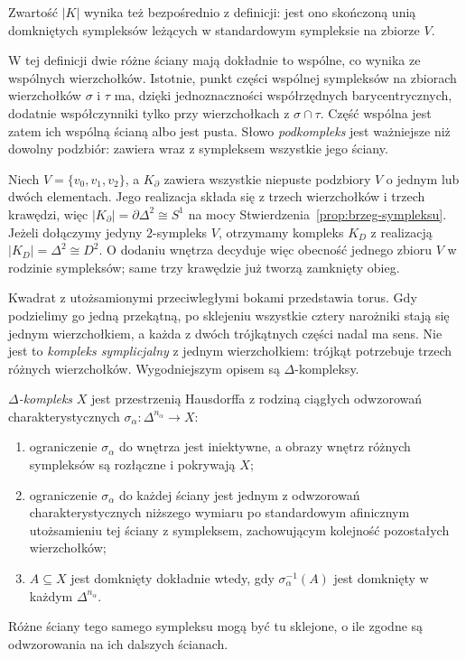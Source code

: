 Zwartość $|K|$ wynika też bezpośrednio z definicji:
jest ono skończoną unią domkniętych sympleksów
leżących w standardowym sympleksie na zbiorze $V$.

W tej definicji dwie różne ściany
mają dokładnie to wspólne, co
wynika ze wspólnych wierzchołków.
Istotnie, punkt części wspólnej sympleksów
na zbiorach wierzchołków $\sigma$ i $\tau$ ma,
dzięki jednoznaczności współrzędnych barycentrycznych,
dodatnie współczynniki tylko przy wierzchołkach
z $\sigma\cap\tau$. Część wspólna jest zatem
ich wspólną ścianą albo jest pusta.
Słowo \emph{podkompleks} jest
ważniejsze niż dowolny podzbiór:
zawiera wraz z sympleksem
wszystkie jego ściany.

\begin{przyklad}
Niech $V=\{v_0,v_1,v_2\}$, a $K_{\partial}$
zawiera wszystkie niepuste podzbiory $V$
o jednym lub dwóch elementach. Jego realizacja
składa się z trzech wierzchołków i trzech krawędzi,
więc $|K_{\partial}|=\partial\Delta^2\cong S^1$
na mocy Stwierdzenia~\ref{prop:brzeg-sympleksu}.
Jeżeli dołączymy jedyny $2$-sympleks $V$,
otrzymamy kompleks $K_D$ z realizacją
$|K_D|=\Delta^2\cong D^2$.
O dodaniu wnętrza decyduje więc obecność
jednego zbioru $V$ w rodzinie sympleksów;
same trzy krawędzie już tworzą zamknięty obieg.
\end{przyklad}

\begin{uwaga}
\label{uwaga:delta-motywacja}
Kwadrat z utożsamionymi przeciwległymi
bokami przedstawia torus. Gdy podzielimy
go jedną przekątną, po sklejeniu wszystkie
cztery narożniki stają się jednym
wierzchołkiem, a każda z dwóch
trójkątnych części nadal ma sens.
Nie jest to \emph{kompleks symplicjalny}
z jednym wierzchołkiem: trójkąt
potrzebuje trzech różnych wierzchołków.
Wygodniejszym opisem są
$\Delta$-kompleksy.
\end{uwaga}

\begin{definicja}
\label{def:delta-kompleks}
\emph{$\Delta$-kompleks} $X$ jest
przestrzenią Hausdorffa z rodziną ciągłych odwzorowań charakterystycznych
$\sigma_\alpha:\Delta^{n_\alpha}\to X$:
\begin{enumerate}[label=(\roman*),leftmargin=*]
\item ograniczenie $\sigma_\alpha$ do wnętrza
      jest iniektywne, a obrazy wnętrz
      różnych sympleksów są rozłączne
      i pokrywają $X$;
\item ograniczenie $\sigma_\alpha$ do każdej
      ściany jest jednym z odwzorowań
      charakterystycznych niższego wymiaru
      po standardowym afinicznym
      utożsamieniu tej ściany z sympleksem, zachowującym
      kolejność pozostałych wierzchołków;
\item $A\subseteq X$ jest domknięty dokładnie
      wtedy, gdy $\sigma_\alpha^{-1}(A)$
      jest domknięty w każdym
      $\Delta^{n_\alpha}$.
\end{enumerate}
Różne ściany tego samego sympleksu
mogą być tu sklejone, o ile zgodne
są odwzorowania na ich dalszych ścianach.
\end{definicja}

